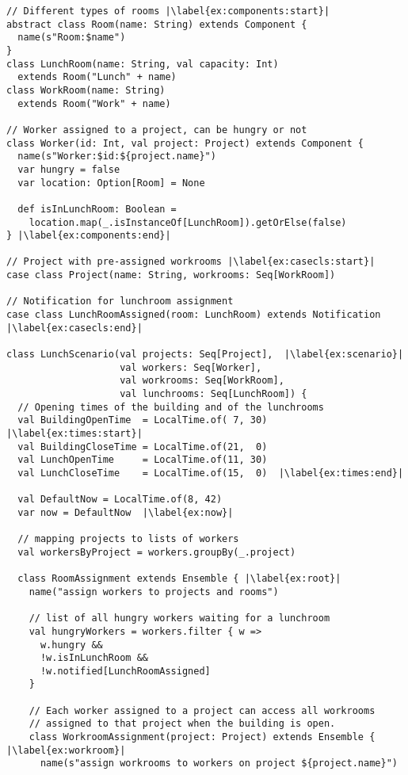 \begin{lstlisting}[style=ensembles]
// Different types of rooms |\label{ex:components:start}|
abstract class Room(name: String) extends Component {
  name(s"Room:$name")
}
class LunchRoom(name: String, val capacity: Int)
  extends Room("Lunch" + name)
class WorkRoom(name: String)
  extends Room("Work" + name)

// Worker assigned to a project, can be hungry or not
class Worker(id: Int, val project: Project) extends Component {
  name(s"Worker:$id:${project.name}")
  var hungry = false
  var location: Option[Room] = None

  def isInLunchRoom: Boolean =
    location.map(_.isInstanceOf[LunchRoom]).getOrElse(false)
} |\label{ex:components:end}|

// Project with pre-assigned workrooms |\label{ex:casecls:start}|
case class Project(name: String, workrooms: Seq[WorkRoom])

// Notification for lunchroom assignment
case class LunchRoomAssigned(room: LunchRoom) extends Notification |\label{ex:casecls:end}|

class LunchScenario(val projects: Seq[Project],  |\label{ex:scenario}|
                    val workers: Seq[Worker],
                    val workrooms: Seq[WorkRoom],
                    val lunchrooms: Seq[LunchRoom]) {
  // Opening times of the building and of the lunchrooms
  val BuildingOpenTime  = LocalTime.of( 7, 30)  |\label{ex:times:start}|
  val BuildingCloseTime = LocalTime.of(21,  0)
  val LunchOpenTime     = LocalTime.of(11, 30)
  val LunchCloseTime    = LocalTime.of(15,  0)  |\label{ex:times:end}|

  val DefaultNow = LocalTime.of(8, 42)
  var now = DefaultNow  |\label{ex:now}|
  
  // mapping projects to lists of workers
  val workersByProject = workers.groupBy(_.project)

  class RoomAssignment extends Ensemble { |\label{ex:root}|
    name("assign workers to projects and rooms")

    // list of all hungry workers waiting for a lunchroom
    val hungryWorkers = workers.filter { w =>
      w.hungry &&
      !w.isInLunchRoom &&
      !w.notified[LunchRoomAssigned]
    }

    // Each worker assigned to a project can access all workrooms
    // assigned to that project when the building is open.
    class WorkroomAssignment(project: Project) extends Ensemble { |\label{ex:workroom}|
      name(s"assign workrooms to workers on project ${project.name}")


\end{lstlisting}
